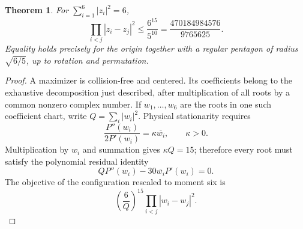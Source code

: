 \documentclass[11pt]{article}
\newtheorem{theorem}{Theorem}[section]
\theoremstyle{remark}
\numberwithin{equation}{section}
\begin{document}
\begin{theorem}\label{thm:six-global}
For $\sum_{i=1}^6|z_i|^2=6$,
\[
 \prod_{i<j}|z_i-z_j|^2\le
 \frac{6^{15}}{5^{10}}=\frac{470184984576}{9765625}.
\]
Equality holds precisely for the origin together with a regular
pentagon of radius $\sqrt{6/5}$, up to rotation and permutation.
\end{theorem}

\begin{proof}
A maximizer is collision-free and centered.  Its coefficients belong
to the exhaustive decomposition just described, after multiplication
of all roots by a common nonzero complex number.  If $w_1,\ldots,w_6$
are the roots in one such coefficient chart, write
$Q=\sum_i|w_i|^2$.  Physical stationarity requires
\[
 \frac{P''(w_i)}{2P'(w_i)}=\kappa\overline{w_i},
 \qquad \kappa>0.
\]
Multiplication by $w_i$ and summation gives $\kappa Q=15$;
therefore every root must satisfy the polynomial residual identity
\begin{equation}\label{eq:six-force-residual}
 QP''(w_i)-30\overline{w_i}P'(w_i)=0.
\end{equation}
The objective of the configuration rescaled to moment six is
\begin{equation}\label{eq:six-chart-value}
 \left(\frac6Q\right)^{15}\prod_{i<j}|w_i-w_j|^2.
\end{equation}


\end{proof}
\end{document}
